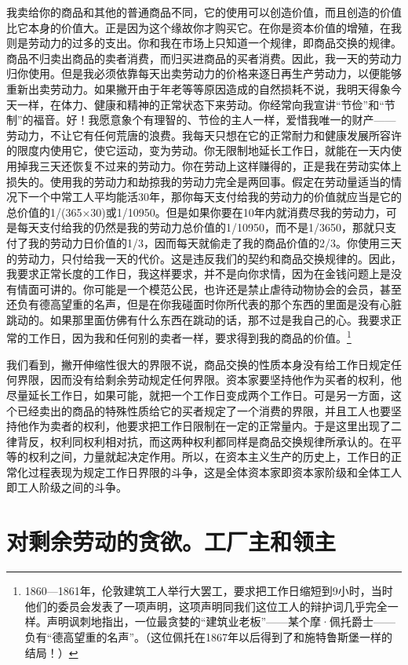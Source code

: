 \documentclass{ctexbook}
\begin{document}
    我卖给你的商品和其他的普通商品不同，它的使用可以创造价值，而且创造的价值比它本身的价值大。正是因为这个缘故你才购买它。在你是资本价值的增殖，在我则是劳动力的过多的支出。你和我在市场上只知道一个规律，即商品交换的规律。商品不归卖出商品的卖者消费，而归买进商品的买者消费。因此，我一天的劳动力归你使用。但是我必须依靠每天出卖劳动力的价格来逐日再生产劳动力，以便能够重新出卖劳动力。如果撇开由于年老等等原因造成的自然损耗不说，我明天得象今天一样，在体力、健康和精神的正常状态下来劳动。你经常向我宣讲“节俭”和“节制”的福音。好！我愿意象个有理智的、节俭的主人一样，爱惜我唯一的财产——劳动力，不让它有任何荒唐的浪费。我每天只想在它的正常耐力和健康发展所容许的限度内使用它，使它运动，变为劳动。你无限制地延长工作日，就能在一天内使用掉我三天还恢复不过来的劳动力。你在劳动上这样赚得的，正是我在劳动实体上损失的。使用我的劳动力和劫掠我的劳动力完全是两回事。假定在劳动量适当的情况下一个中常工人平均能活30年，那你每天支付给我的劳动力的价值就应当是它的总价值的1/(365×30)或1/10950。但是如果你要在10年内就消费尽我的劳动力，可是每天支付给我的仍然是我的劳动力总价值的1/10950，而不是1/3650，那就只支付了我的劳动力日价值的1/3，因而每天就偷走了我的商品价值的2/3。你使用三天的劳动力，只付给我一天的代价。这是违反我们的契约和商品交换规律的。因此，我要求正常长度的工作日，我这样要求，并不是向你求情，因为在金钱问题上是没有情面可讲的。你可能是一个模范公民，也许还是禁止虐待动物协会的会员，甚至还负有德高望重的名声，但是在你我碰面时你所代表的那个东西的里面是没有心脏跳动的。如果那里面仿佛有什么东西在跳动的话，那不过是我自己的心。我要求正常的工作日，因为我和任何别的卖者一样，要求得到我的商品的价值。\footnote{1860—1861年，伦敦建筑工人举行大罢工，要求把工作日缩短到9小时，当时他们的委员会发表了一项声明，这项声明同我们这位工人的辩护词几乎完全一样。声明讽刺地指出，一位最贪婪的“建筑业老板”——某个摩·佩托爵士——负有“德高望重的名声”。（这位佩托在1867年以后得到了和施特鲁斯堡一样的结局！）}

    我们看到，撇开伸缩性很大的界限不说，商品交换的性质本身没有给工作日规定任何界限，因而没有给剩余劳动规定任何界限。资本家要坚持他作为买者的权利，他尽量延长工作日，如果可能，就把一个工作日变成两个工作日。可是另一方面，这个已经卖出的商品的特殊性质给它的买者规定了一个消费的界限，并且工人也要坚持他作为卖者的权利，他要求把工作日限制在一定的正常量内。于是这里出现了二律背反，权利同权利相对抗，而这两种权利都同样是商品交换规律所承认的。在平等的权利之间，力量就起决定作用。所以，在资本主义生产的历史上，工作日的正常化过程表现为规定工作日界限的斗争，这是全体资本家即资本家阶级和全体工人即工人阶级之间的斗争。

    \section{对剩余劳动的贪欲。工厂主和领主}
\end{document}
